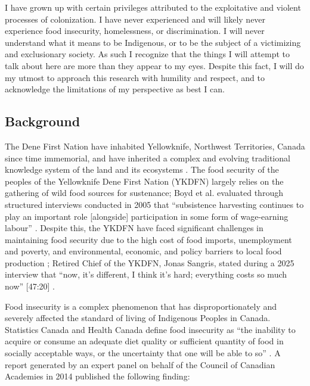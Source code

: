 \documentclass{report}
\begin{document}
\hspace{24pt} I have grown up with certain privileges attributed to the exploitative and violent processes of colonization.
I have never experienced and will likely never experience food insecurity, homelessness, or discrimination.
I will never understand what it means to be Indigenous, or to be the subject of a victimizing and exclusionary society.
As such I recognize that the things I will attempt to talk about here are more than they appear to my eyes.
Despite this fact, I will do my utmost to approach this research with humility and respect, and to acknowledge the limitations of my perspective as best I can.

\clearpage

\subsection{Background}

\hspace{24pt} The Dene First Nation have inhabited Yellowknife, Northwest Territories, Canada since time immemorial, and have inherited a complex and evolving traditional knowledge system of the land and its ecosystems \parencite{lorecapturingtraditional}.
The food security of the peoples of the Yellowknife Dene First Nation (YKDFN) largely relies on the gathering of wild food sources for sustenance;
Boyd et al. evaluated through structured interviews conducted in 2005 that ``subsistence harvesting continues to play an important role [alongside] participation in some form of wage-earning labour'' \parencite[268]{socialculturalcapital}.
Despite this, the YKDFN have faced significant challenges in maintaining food security due to the high cost of food imports, unemployment and poverty, and environmental, economic, and policy barriers to local food production \parencite{resilientcommunities};
Retired Chief of the YKDFN, Jonas Sangris, stated during a 2025 interview that ``now, it's different, I think it's hard; everything costs so much now'' [47:20] \parencite{jonassangris}.

\hspace{24pt} Food insecurity is a complex phenomenon that has disproportionately and severely affected the standard of living of Indigenous Peoples in Canada.
Statistics Canada and Health Canada define food insecurity as ``the inability to acquire or consume an adequate diet quality or sufficient quantity of food in socially acceptable ways, or the uncertainty that one will be able to so'' \parencite[para. 2]{statscanfoodinsecurity}.
A report generated by an expert panel on behalf of the Council of Canadian Academies in 2014 published the following finding:
\end{document}
